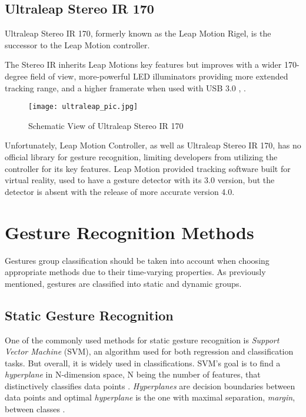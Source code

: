\subsection{Ultraleap Stereo IR 170}

Ultraleap Stereo IR 170, formerly known as the Leap Motion Rigel, is the successor to the Leap Motion controller.

The Stereo IR inherits Leap Motions key features but improves with a wider 170-degree field of view, more-powerful LED illuminators providing more extended tracking range, and a higher framerate when used with USB 3.0 \cite{ultraleap}, \cite{ultraleap2}.

\begin{figure}[H]
	\centering
    \texttt{[image: ultraleap\_pic.jpg]}
	\caption{Schematic View of Ultraleap Stereo IR 170 \cite{ultraleap}}
	\label{fig:UltraLeapscheme}
\end{figure}

Unfortunately, Leap Motion Controller, as well as Ultraleap Stereo IR 170, has no official library for gesture recognition, limiting developers from utilizing the controller for its key features. Leap Motion provided tracking software built for virtual reality, used to have a gesture detector with its 3.0 version, but the detector is absent with the release of more accurate version 4.0.


\section{Gesture Recognition Methods
}

Gestures group classification should be taken into account when choosing appropriate methods due to their time-varying properties. As previously mentioned, gestures are classified into static and dynamic groups. 

\subsection{Static Gesture Recognition}

One of the commonly used methods for static gesture recognition is \textit{Support Vector Machine} (SVM), an algorithm used for both regression and classification tasks. But overall, it is widely used in classifications. SVM's goal is to find a \textit{hyperplane} in N-dimension space, N being the number of features, that distinctively classifies data points \cite{svmIntroToML}. \textit{Hyperplanes} are decision boundaries between data points and optimal \textit{hyperplane} is the one with maximal separation, \textit{margin}, between classes \cite{savaris}.

